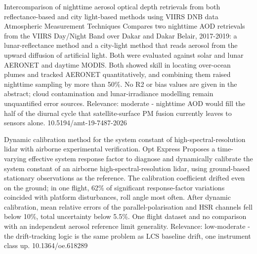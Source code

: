 \documentclass[10pt]{article}
\begin{document}
{Intercomparison of nighttime aerosol optical depth retrievals from both reflectance-based and city light-based methods using VIIRS DNB data}
{Atmospheric Measurement Techniques}
{Compares two nighttime AOD retrievals from the VIIRS Day/Night Band over Dakar and Dakar Belair, 2017-2019: a lunar-reflectance method and a city-light method that reads aerosol from the upward diffusion of artificial light. Both were evaluated against solar and lunar AERONET and daytime MODIS. Both showed skill in locating over-ocean plumes and tracked AERONET quantitatively, and combining them raised nighttime sampling by more than 50\%. No R2 or bias values are given in the abstract; cloud contamination and lunar-irradiance modelling remain unquantified error sources. Relevance: moderate - nighttime AOD would fill the half of the diurnal cycle that satellite-surface PM fusion currently leaves to sensors alone.}
{10.5194/amt-19-7487-2026}

{Dynamic calibration method for the system constant of high-spectral-resolution lidar with airborne experimental verification.}
{Opt Express}
{Proposes a time-varying effective system response factor to diagnose and dynamically calibrate the system constant of an airborne high-spectral-resolution lidar, using ground-based stationary observations as the reference. The calibration coefficient drifted even on the ground; in one flight, 62\% of significant response-factor variations coincided with platform disturbances, roll angle most often. After dynamic calibration, mean relative errors of the parallel-polarisation and HSR channels fell below 10\%, total uncertainty below 5.5\%. One flight dataset and no comparison with an independent aerosol reference limit generality. Relevance: low-moderate - the drift-tracking logic is the same problem as LCS baseline drift, one instrument class up.}
{10.1364/oe.618289}

\par{}\baselineskip{}\baselineskip
{}
\end{document}
